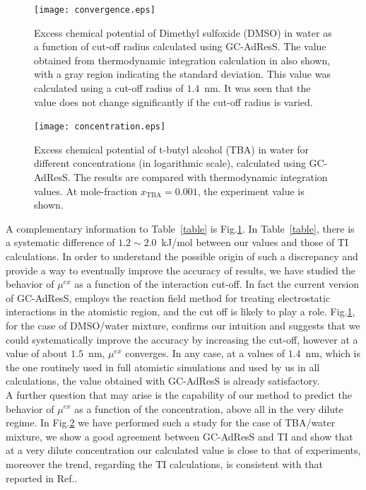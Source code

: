 \documentclass[a4paper,preprint,unsortedaddress]{revtex4-1}
\newcommand{\recheck}[1]{{\color{red} #1}}
\newcommand{\concenttba}{x_{\textrm{TBA}}}
\begin{document}
\begin{figure}
\center
\texttt{[image: convergence.eps]}
\caption{ \recheck{Excess chemical potential of Dimethyl sulfoxide (DMSO) in water as a function of cut-off radius calculated using GC-AdResS. The value obtained from thermodynamic integration calculation in also shown, with a gray region indicating the standard deviation. This value was calculated using a cut-off radius of $1.4$~nm. It was seen that the value does not change significantly if the cut-off radius is varied.}}
\label{convergence}
\end{figure}

\begin{figure}
\center
\texttt{[image: concentration.eps]}
\caption{ \recheck{Excess chemical potential of t-butyl alcohol (TBA) in water for different concentrations (in logarithmic scale), calculated using GC-AdResS. The results are compared with thermodynamic integration values. At mole-fraction $\concenttba=0.001$, the experiment value is shown. \label{concentration}}}
\end{figure}


\recheck{A complementary information to Table~\ref{table} is
  Fig.\ref{convergence}. In
  Table~\ref{table}, there is a systematic difference of
  $1.2 \sim 2.0$~kJ/mol between our values and those of TI
  calculations. In order to understand the possible origin of such a
  discrepancy and provide a way to eventually improve the accuracy of
  results, we have studied the behavior of $\mu^{ex}$ as a function of
  the interaction cut-off. In fact the current version of GC-AdResS,
  employs the reaction field method for treating electrostatic
  interactions in the atomistic region, and the cut off is likely to
  play a role. Fig.\ref{convergence}, for the case of DMSO/water
  mixture, confirms our intuition and suggests that we could
  systematically improve the accuracy by increasing the cut-off,
  however at a value of about $1.5$~nm, $\mu^{ex}$ converges. In any
  case, at a values of $1.4$~nm, which is the one routinely used in
  full atomistic simulations and used by us in all calculations, the
  value obtained with GC-AdResS is already satisfactory.\\

  A further
  question that may arise is the capability of our method to predict
  the behavior of $\mu^{ex}$ as a function of the concentration, above
  all in the very dilute regime. In Fig.\ref{concentration} we have
  performed such a study for the case of TBA/water mixture, we show a
  good agreement between GC-AdResS and TI and show that at a very
  dilute concentration our calculated value is close to that of
  experiments, moreover the trend, regarding the TI calculations, is
  consistent with that reported in Ref.\cite{nico}.\\}
\end{document}
